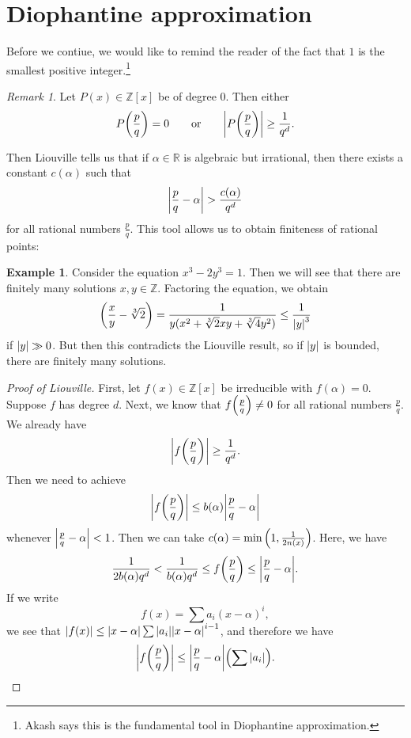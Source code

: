 \documentclass[leqno, openany]{memoir}
\theoremstyle{definition}
\newtheorem{exm}[thm]{Example}
\theoremstyle{remark}
\newtheorem{rmk}[thm]{Remark}
\theoremstyle{plain}
\theoremstyle{definition}
\theoremstyle{remark}
\newcommand{\R}{\mathbb{R}}
\newcommand{\Z}{\mathbb{Z}}
\begin{document}
\section{Diophantine approximation}

Before we contiue, we would like to remind the reader of the fact that $1$ is the smallest positive integer.\footnote{Akash says this is the fundamental tool in Diophantine approximation.}

\begin{rmk}
    Let $P(x) \in \Z[x]$ be of degree $0$. Then either
    \[ P\qty(\frac{p}{q}) = 0 \qquad \text{or} \qquad \abs{P\qty(\frac{p}{q})} \geq \frac{1}{q^d}. \]
\end{rmk}

Then Liouville tells us that if $\alpha \in \R$ is algebraic but irrational, then there exists a constant $c(\alpha)$ such that 
\[ \abs{\frac{p}{q} - \alpha} > \frac{c(\alpha)}{q^d} \]
for all rational numbers $\frac{p}{q}$. This tool allows us to obtain finiteness of rational points:

\begin{exm}
    Consider the equation $x^3 - 2 y^3 = 1$. Then we will see that there are finitely many solutions $x,y \in \Z$. Factoring the equation, we obtain
    \[ \qty(\frac{x}{y} - \sqrt[3]{2}) = \frac{1}{y(x^2 + \sqrt[3]{2} xy + \sqrt[3]{4} y^2)} \leq \frac{1}{\abs{y}^3} \]
    if $\abs{y} \gg 0$. But then this contradicts the Liouville result, so if $\abs{y}$ is bounded, there are finitely many solutions.
\end{exm}

\begin{proof}[Proof of Liouville]
    First, let $f(x) \in \Z[x]$ be irreducible with $f(\alpha) = 0$. Suppose $f$ has degree $d$. Next, we know that $f\qty(\frac{p}{q}) \neq 0$ for all rational numbers $\frac{p}{q}$. We already have
    \[ \abs{f\qty(\frac{p}{q})} \geq \frac{1}{q^d}. \]
    Then we need to achieve
    \[ \abs{f\qty(\frac{p}{q})} \leq b(\alpha) \abs{\frac{p}{q} - \alpha} \]
    whenever $\abs{\frac{p}{q} - \alpha} < 1$. Then we can take $c(\alpha) = \min\qty(1, \frac{1}{2n(x)})$. Here, we have
    \[ \frac{1}{2b(\alpha)q^d} < \frac{1}{b(\alpha)q^d} \leq f\qty(\frac{p}{q}) \leq \abs{\frac{p}{q} - \alpha}. \]
    If we write
    \[ f(x) = \sum a_i (x-\alpha)^i, \]
    we see that $\abs{f(x)} \leq \abs{x-\alpha} \sum \abs{a_i} \abs{x-\alpha}^{i-1}$, and therefore we have
    \[ \abs{f\qty(\frac{p}{q})} \leq \abs{\frac{p}{q} - \alpha} \qty(\sum \abs{a_i}). \qedhere \]
\end{proof}
\end{document}
